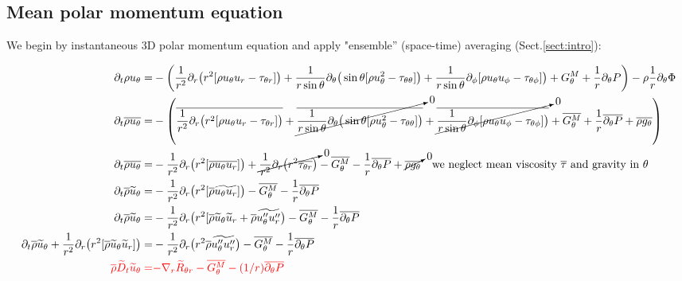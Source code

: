 \documentclass[10pt,paper=a4]{report}
\newcommand{\eht}{\overline}
\newcommand{\fht}{\widetilde}
\begin{document}
\fontsize{12pt}{20pt}

\subsection{Mean polar momentum equation}

We begin by instantaneous 3D polar momentum equation and apply "ensemble'' (space-time) averaging (Sect.\ref{sect:intro}):

\fontsize{9pt}{20pt}

\begin{align}
\partial_{t} \rho u_{\theta} = & -\left( \frac{1}{r^{2}} \partial_{r} \big(r^{2} [\rho u_{\theta} u_{r} - \tau_{\theta r}]\big) + \frac{1}{r\sin{\theta}}\partial_{\theta}\big(\sin{\theta}[\rho u_{\theta}^{2} - \tau_{\theta \theta}]\big) + \frac{1}{r\sin{\theta}}\partial_{\phi}[\rho u_{\theta} u_{\phi} - \tau_{\theta \phi}]\big) + G_\theta^M + \frac{1}{r} \partial_{\theta} P \right) - \rho \frac{1}{r} \partial_{\theta} \Phi \\
\partial_{t} \eht{\rho u_{\theta}} = & -\left( \eht{\frac{1}{r^{2}} \partial_{r} \big(r^{2} [\rho u_{\theta} u_{r} - \tau_{\theta r}]\big)} + \cancelto{0}{\eht{\frac{1}{r\sin{\theta}}\partial_{\theta}\big(\sin{\theta}[\rho u_{\theta}^{2} - \tau_{\theta \theta}]\big)}} + \cancelto{0}{\eht{\frac{1}{r\sin{\theta}}\partial_{\phi}[\rho u_{\theta} u_{\phi} - \tau_{\theta \phi}]\big)}} + \eht{G_\theta^M} + \frac{1}{r} \eht{\partial_{\theta} P} + \eht{\rho g_\theta}\right) \\
\partial_{t} \eht{\rho u_{\theta}} = & -\frac{1}{r^{2}} \partial_{r} \big( r^{2} [\eht{\rho u_{\theta} u_{r}}] \big) + \cancelto{0}{\frac{1}{r^{2}} \partial_{r} \big(r^{2} \eht{\tau_{\theta r}} \big)} - \eht{G_\theta^M} - \frac{1}{r} \eht{\partial_{\theta} P} + \cancelto{0}{\eht{\rho g_\theta}} \ \ \ \mbox{we neglect mean viscosity $\eht{\tau}$ and gravity in $\theta$} \\
\partial_{t} \eht{\rho} \fht{u}_{\theta} = & -\frac{1}{r^{2}} \partial_{r} \big( r^{2} [\eht{\rho} \fht{u_{\theta} u_{r}}] \big) - \eht{G_\theta^M} - \frac{1}{r} \eht{\partial_{\theta} P}\\
\partial_{t} \eht{\rho} \fht{u}_{\theta} = & -\frac{1}{r^{2}} \partial_{r} \big( r^{2} [\eht{\rho} \fht{u}_{\theta} \fht{u}_{r} + \eht{\rho}\fht{u''_\theta u''_r} \big) - \eht{G_\theta^M} - \frac{1}{r} \eht{\partial_{\theta} P}\\ 
\partial_{t} \eht{\rho} \fht{u}_{\theta} + \frac{1}{r^{2}} \partial_{r} \big( r^{2} [\eht{\rho} \fht{u}_{\theta} \fht{u}_{r}] \big) = & -\frac{1}{r^{2}} \partial_{r} \big( r^{2} \eht{\rho}\fht{u''_\theta u''_r} \big) - \eht{G_\theta^M} - \frac{1}{r} \eht{\partial_{\theta} P}\\
{\color{red} \eht{\rho}\fht{D}_t \fht{u}_\theta =} & {\color{red} -\nabla_r \fht{R}_{\theta r} - \eht{G_\theta^M} - (1/r) \eht{\partial_{\theta} P}}
\end{align}
\end{document}

